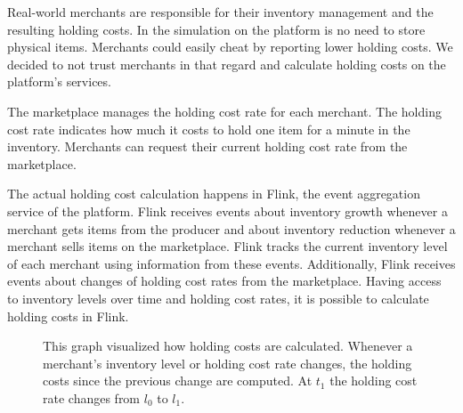 Real-world merchants are responsible for their inventory management and the resulting holding costs.
In the simulation on the \pricewars platform is no need to store physical items.
Merchants could easily cheat by reporting lower holding costs.
We decided to not trust merchants in that regard and calculate holding costs on the platform's services.

The marketplace manages the holding cost rate for each merchant.
The holding cost rate indicates how much it costs to hold one item for a minute in the inventory.
Merchants can request their current holding cost rate from the marketplace.

The actual holding cost calculation happens in Flink, the event aggregation service of the \pricewars platform.
Flink receives events about inventory growth whenever a merchant gets items from the producer and about inventory reduction whenever a merchant sells items on the marketplace.
Flink tracks the current inventory level of each merchant using information from these events.
Additionally, Flink receives events about changes of holding cost rates from the marketplace.
Having access to inventory levels over time and holding cost rates, it is possible to calculate holding costs in Flink.

\begin{figure}[t]
\centering
{}
\caption{
	This graph visualized how holding costs are calculated.
	Whenever a merchant's inventory level or holding cost rate changes, the holding costs since the previous change are computed.
	At $t_1$ the holding cost rate changes from $l_0$ to $l_1$.}
\label{fig:holding_cost}
\end{figure}

